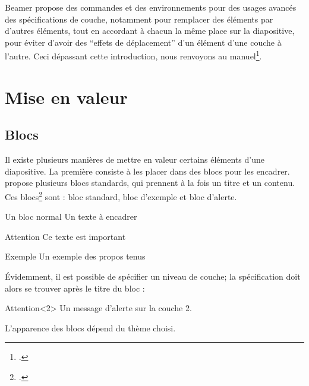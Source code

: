 Beamer propose des commandes et des environnements pour des usages avancés des spécifications de couche, notamment pour remplacer des éléments par d'autres éléments, tout en accordant à chacun la même place sur la diapositive, pour éviter d'avoir des \enquote{effets de déplacement} d'un élément d'une couche à l'autre. 
Ceci dépassant cette introduction, nous renvoyons au manuel\footcite{beamer_overlays}.
\section{Mise en valeur}

\subsection{Blocs}

Il existe plusieurs manières de mettre en valeur certains éléments d'une diapositive. La première  consiste à les placer dans des blocs pour les encadrer.  propose plusieurs blocs standards, qui prennent à la fois un titre et un contenu. Ces blocs\footcites[Il est possible de créer ses propres blocs : voir  ][]{beamer_box}[il existe aussi des éléments proches des blocs que sont les encadrés, pour mettre en valeur des définitions, des théorèmes : voir][]{beamer_theorems} sont  : bloc standard, bloc d'exemple et bloc d'alerte.

\begin{latexcode}
\begin{block}{Un bloc normal} 
    Un texte à encadrer
\end{block}
\begin{alertblock}{Attention} 
    Ce texte est important
\end{alertblock}
\begin{exampleblock}{Exemple} 
    Un exemple des propos tenus
\end{exampleblock}
\end{latexcode}

Évidemment, il est possible de spécifier un niveau de couche; la spécification doit alors se trouver après le titre du bloc :

\begin{latexcode}
\begin{alertblock}{Attention}<2>
    Un message d'alerte sur la couche 2.
\end{alertblock}
\end{latexcode}

L'apparence des blocs dépend du thème choisi.

